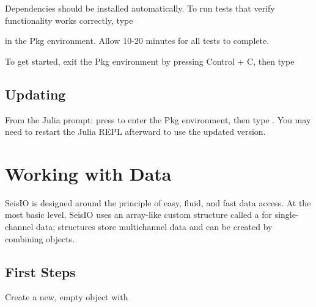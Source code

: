 \documentclass[letterpaper,11pt,english]{sphinxmanual}
\begin{document}
Dependencies should be installed automatically. To run tests that verify functionality works correctly, type

%
\begin{sphinxVerbatim}[commandchars=\\\{\}]
 
\end{sphinxVerbatim}

in the Pkg environment. Allow 10-20 minutes for all tests to complete.

To get started, exit the Pkg environment by pressing Control + C, then type

%
\begin{sphinxVerbatim}[commandchars=\\\{\}]
 
\end{sphinxVerbatim}


\subsection{Updating}
\label{\detokenize{src/intro:updating}}
From the Julia prompt: press \sphinxcode{\sphinxupquote{{]}}} to enter the Pkg environment, then type . You may need to restart the Julia REPL afterward to use the updated version.


\section{Working with Data}
\label{\detokenize{src/working_with_data:working-with-data}}\label{\detokenize{src/working_with_data::doc}}
SeisIO is designed around the principle of easy, fluid, and fast data access.
At the most basic level, SeisIO uses an array-like custom structure called a
 for single-channel data;  structures store
multichannel data and can be created by combining  objects.


\subsection{First Steps}
\label{\detokenize{src/working_with_data:first-steps}}
Create a new, empty  object with


\begin{fulllineitems}
\end{fulllineitems}
\end{document}
